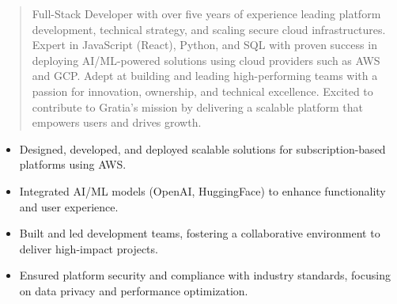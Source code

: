 



\makecvheader

\begin{quote}
  \noindent
  Full-Stack Developer with over five years of experience leading platform development, technical strategy, and scaling secure cloud infrastructures. Expert in JavaScript (React), Python, and SQL with proven success in deploying AI/ML-powered solutions using cloud providers such as AWS and GCP. Adept at building and leading high-performing teams with a passion for innovation, ownership, and technical excellence. Excited to contribute to Gratia’s mission by delivering a scalable platform that empowers users and drives growth.
\end{quote}

\par\smallskip
\noindent
\begin{minipage}{20cm}
  \begin{minipage}{9.75cm}
    \begin{itemize}
      \item Designed, developed, and deployed scalable solutions for subscription-based platforms using AWS.
      \item Integrated AI/ML models (OpenAI, HuggingFace) to enhance functionality and user experience.
    \end{itemize}
  \end{minipage}
  \hfill
  \begin{minipage}{9.75cm}
    \begin{itemize}
      \item Built and led development teams, fostering a collaborative environment to deliver high-impact projects.
      \item Ensured platform security and compliance with industry standards, focusing on data privacy and performance optimization.
    \end{itemize}
  \end{minipage}
\end{minipage}
\par\smallskip
\divider


